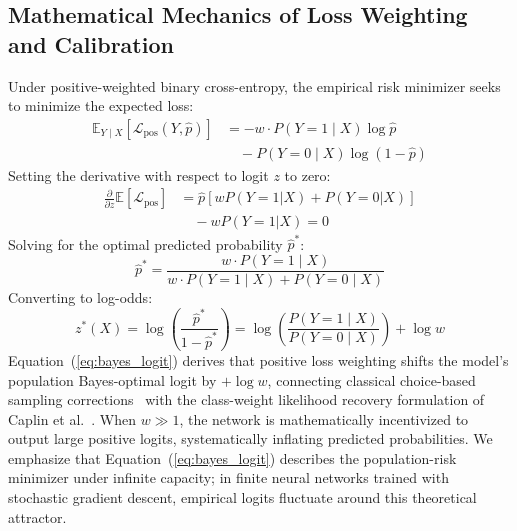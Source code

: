 \documentclass[preprint,12pt]{elsarticle}
\begin{document}
\subsection{Mathematical Mechanics of Loss Weighting and Calibration}
Under positive-weighted binary cross-entropy, the empirical risk minimizer seeks to minimize the expected loss:
\begin{align}
\mathbb{E}_{Y \mid X} [\mathcal{L}_{\text{pos}}(Y, \hat{p})] &= - w \cdot P(Y=1 \mid X) \log \hat{p} \nonumber \\
&\quad - P(Y=0 \mid X) \log(1 - \hat{p})
\end{align}
Setting the derivative with respect to logit $z$ to zero:
\begin{align}
\frac{\partial}{\partial z} \mathbb{E}[\mathcal{L}_{\text{pos}}] &= \hat{p} \left[ w P(Y=1|X) + P(Y=0|X) \right] \nonumber \\
&\quad - w P(Y=1|X) = 0
\end{align}
Solving for the optimal predicted probability $\hat{p}^*$:
\begin{equation}
\hat{p}^* = \frac{w \cdot P(Y=1 \mid X)}{w \cdot P(Y=1 \mid X) + P(Y=0 \mid X)}
\end{equation}
Converting to log-odds:
\begin{equation}
z^*(X) = \log\left(\frac{\hat{p}^*}{1 - \hat{p}^*}\right) = \log\left(\frac{P(Y=1 \mid X)}{P(Y=0 \mid X)}\right) + \log w
\label{eq:bayes_logit}
\end{equation}
Equation~(\ref{eq:bayes_logit}) derives that positive loss weighting shifts the model's population Bayes-optimal logit by $+\log w$, connecting classical choice-based sampling corrections~\cite{king2001logistic} with the class-weight likelihood recovery formulation of Caplin et al.~\cite{caplin2022calibrating}. When $w \gg 1$, the network is mathematically incentivized to output large positive logits, systematically inflating predicted probabilities. We emphasize that Equation~(\ref{eq:bayes_logit}) describes the population-risk minimizer under infinite capacity; in finite neural networks trained with stochastic gradient descent, empirical logits fluctuate around this theoretical attractor.
\end{document}
